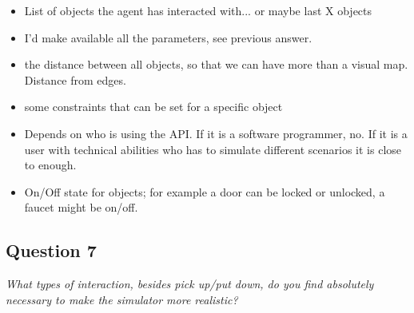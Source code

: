 \begin{itemize}
	\item List of objects the agent has interacted with... or maybe last X objects
	\item I'd make available all the parameters, see previous answer.
	\item the distance between all objects, so that we can have more than a visual map. Distance from edges.
	\item some constraints that can be set for a specific object
	\item Depends on who is using the API. If it is a software programmer, no. If it is a user with technical abilities who has to simulate different scenarios it is close to enough.
	\item On/Off state for objects; for example a door can be locked or unlocked, a faucet might be on/off. 
\end{itemize}

\subsection{Question 7}
\emph{What types of interaction, besides pick up/put down, do you find absolutely necessary to make the simulator more realistic?}

